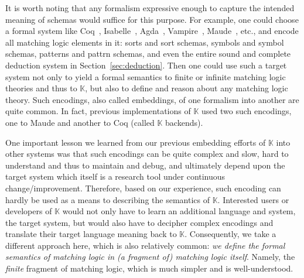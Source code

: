 \documentclass[UTF8,11pt]{article}
\theoremstyle{plain}
\theoremstyle{definition}
\theoremstyle{remark}
\newcommand{\K}{\mbox{$\mathbb{K}$}\xspace}
\begin{document}
It is worth noting that any formalism expressive enough to capture the intended
meaning of schemas would suffice for this purpose.
For example, one could choose a formal system like Coq~\cite{coq},
Isabelle~\cite{isabelle}, Agda~\cite{agda}, Vampire~\cite{vampire},
Maude~\cite{clavel-et-al99a}, etc., and encode all matching logic elements in 
it:
sorts and sort schemas, symbols and symbol schemas, patterns and
pattrn schemas, and even the entire sound and complete deduction system in
Section~\ref{sec:deduction}.
Then one could use such a target system not only to yield a formal semantics
to finite or infinite matching logic theories and thus to \K, but also to
define and reason about any matching logic theory.
Such encodings, also called embeddings, of one formalism into another are
quite common.
In fact, previous implementations of \K used two such encodings, one to
Maude and another to Coq (called \K backends).

One important lesson we learned from our previous embedding efforts of \K
into other systems was that such encodings can be quite complex and slow,
hard to understand and thus to maintain and debug, and ultimately depend
upon the target system which itself is a research tool under continuous
change/improvement.
Therefore, based on our experience, such encoding can hardly
be used as a means to describing the semantics of \K.
Interested users or developers of \K would not only have to learn an
additional language and system, the target system, but would also have to
decipher complex encodings and translate their target language meaning back
to \K.
Consequently, we take a different approach here, which is also relatively
common:
\emph{we define the formal semantics of matching logic in (a fragment of)
matching logic itself}.
Namely, the \emph{finite} fragment of matching logic, which is much simpler
and is well-understood.
\end{document}
